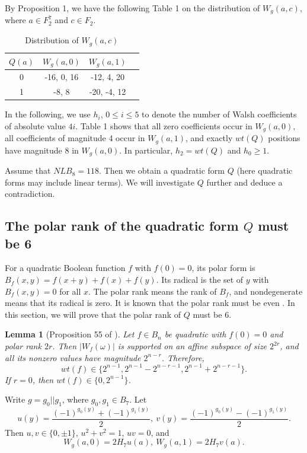 \documentclass[11pt]{article}
\newtheorem{lemma}{Lemma}
\newtheorem{open problem}{Open problem}
\begin{document}
By Proposition 1, we have the following Table 1 on the distribution of $W_g(a,c)$, where $a\in F_2^7$ and $c\in F_2$.
\begin{table}[!h]
\caption{Distribution of $W_g(a,c)$}
 \begin{center}\begin{tabular}{|c|c|c|c|}
  \hline
$Q(a)$ & $W_g(a,0)$ &  $W_g(a,1)$ \\
  \hline
  0 & -16, 0, 16  &  -12, 4, 20  \\
  \hline
  1 & -8, 8 &  -20, -4, 12  \\
  \hline
 \end{tabular}
     \end{center}
     \end{table}
\endproof
In the following, we use $h_i$, $0\le i\le 5$ to denote the number of Walsh coefficients of absolute value $4i$. Table 1 shows that all zero coefficients occur in $W_g(a,0)$, all coefficients of magnitude 4 occur in $W_g(a,1)$, and exactly $wt(Q)$ positions have magnitude 8 in $W_g(a,0)$. In
particular, $h_2 = wt(Q)$ and $h_0\ge 1$.

Assume that $NLB_8=118$. Then we obtain a quadratic form $Q$ (here quadratic forms may include linear terms). We will investigate $Q$ further and deduce a contradiction.

\subsection{The polar rank of the quadratic form $Q$ must be 6}
For a quadratic Boolean function $f$ with $f(0)=0$, its polar form is $B_f(x,y)=f(x+y)+f(x)+f(y)$. Its radical is the set of $y$ with $B_f(x,y)=0$ for all $x$. The polar rank means the rank of $B_f$, and nondegenerate means that its radical is zero. It is known that the polar rank must be even \cite{Car}. In this section, we will prove that the polar rank of $Q$ must be 6.

\begin{lemma} [Proposition 55 of \cite{Car}] Let $f\in B_n$ be quadratic with $f(0)=0$ and polar rank $2r$. Then $|W_f(\omega)|$ is supported on an affine subspace of size $2^{2r}$, and all its nonzero values have magnitude $2^{n-r}$. Therefore,
\[
wt(f)\in \{2^{n-1},2^{n-1}-2^{n-r-1},2^{n-1}+2^{n-r-1}\}.
\]
If $r=0$, then $wt(f)\in \{0, 2^{n-1}\}$.
\end{lemma}

Write $g=g_0||g_1$, where $g_0,g_1\in B_7$. Let
\[
u(y)=\frac{(-1)^{g_0(y)}+(-1)^{g_1(y)}}{2},\ v(y)=\frac{(-1)^{g_0(y)}-(-1)^{g_1(y)}}{2}.
\]
Then $u,v\in \{0,\pm1\}$, $u^2+v^2=1$, $uv=0$, and
\begin{equation}
W_g(a,0)=2H_7u(a), \ W_g(a,1)=2H_7v(a).
\end{equation}
\end{document}
